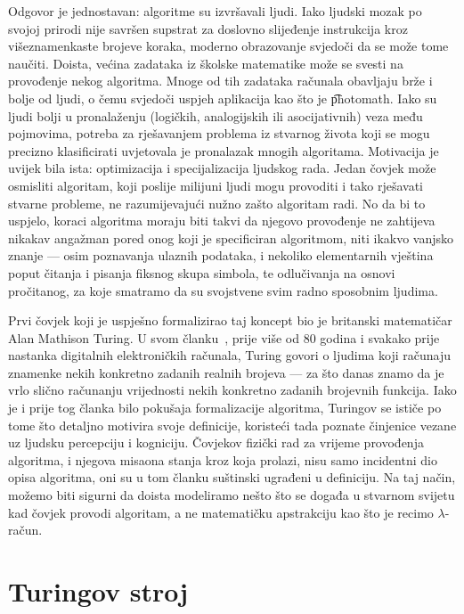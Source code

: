 Odgovor je jednostavan: algoritme su izvršavali ljudi. Iako ljudski mozak po svojoj prirodi nije savršen supstrat za doslovno slijeđenje instrukcija kroz višeznamenkaste brojeve koraka, moderno obrazovanje svjedoči da se može tome na\-u\-či\-ti. Doista, većina zadataka iz školske matematike može se svesti na provođenje nekog algoritma. Mnoge od tih zadataka računala obavljaju brže i bolje od ljudi, o čemu svjedoči uspjeh aplikacija kao što je \t{photomath}. Iako su ljudi bolji u pronalaženju (logičkih, analogijskih ili asocijativnih) veza među pojmovima, potreba za rješavanjem problema iz stvarnog života koji se mogu precizno klasificirati uvjetovala je pronalazak mnogih algoritama. Motivacija je uvijek bila ista: optimizacija i specijalizacija ljudskog rada. Jedan čovjek može osmisliti algoritam, koji poslije milijuni ljudi mogu provoditi i tako rješavati stvarne probleme, ne razumijevajući nužno zašto algoritam radi. No da bi to uspjelo, koraci algoritma moraju biti takvi da njegovo provođenje ne zahtijeva nikakav angažman pored onog koji je specificiran algoritmom, niti ikakvo vanjsko znanje --- osim poznavanja ulaznih podataka, i nekoliko elementarnih vještina poput čitanja i pisanja fiksnog skupa simbola, te odlučivanja na osnovi pročitanog, za koje smatramo da su svojstvene svim radno sposobnim ljudima.

Prvi čovjek koji je uspješno formalizirao taj koncept bio je britanski matematičar Alan Mathison Turing. U svom članku~\cite{turing}, prije više od 80 godina i svakako prije nastanka digitalnih elektroničkih računala, Turing govori o ljudima koji računaju znamenke nekih konkretno zadanih realnih brojeva --- za što danas znamo da je vrlo slično računanju vrijednosti nekih konkretno zadanih brojevnih funkcija. Iako je i prije tog članka bilo pokušaja formalizacije algoritma, Turingov se ističe po tome što detaljno motivira svoje definicije, koristeći tada poznate činjenice vezane uz ljudsku percepciju i kogniciju. Čovjekov fizički rad za vrijeme provođenja algoritma, i njegova misaona stanja kroz koja prolazi, nisu samo incidentni dio opisa algoritma, oni su u tom članku suštinski ugrađeni u definiciju. Na taj način, možemo biti sigurni da doista modeliramo nešto što se događa u stvarnom svijetu kad čovjek provodi algoritam, a ne matematičku apstrakciju kao što je recimo $\lambda$-račun.

\section{Turingov stroj}

